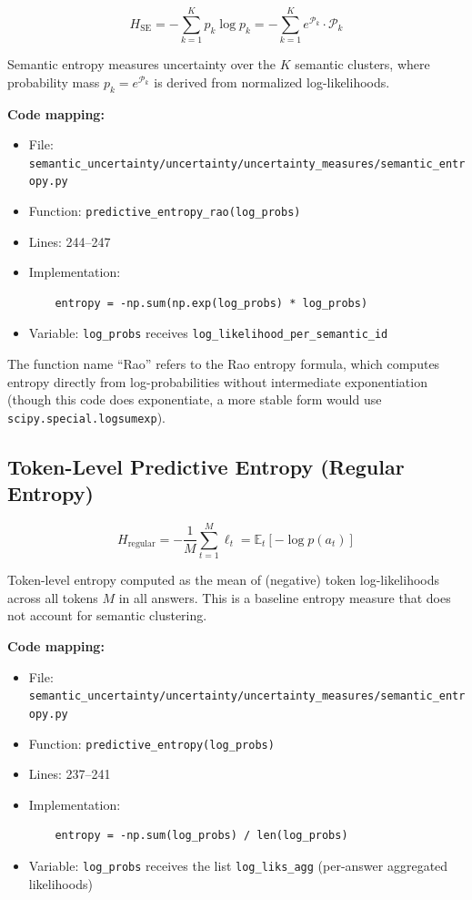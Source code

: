 \documentclass{article}
\begin{document}
\begin{equation}
H_{\text{SE}} = -\sum_{k=1}^{K} p_k \log p_k = -\sum_{k=1}^{K} e^{\mathcal{P}_k} \cdot \mathcal{P}_k
\label{eq:semantic_entropy}
\end{equation}

Semantic entropy measures uncertainty over the $K$ semantic clusters, where probability mass $p_k = e^{\mathcal{P}_k}$ is derived from normalized log-likelihoods.

\textbf{Code mapping:}
\begin{itemize}
    \item File: \texttt{semantic\_uncertainty/uncertainty/uncertainty\_measures/semantic\_entropy.py}
    \item Function: \texttt{predictive\_entropy\_rao(log\_probs)}
    \item Lines: 244--247
    \item Implementation:
    \begin{verbatim}
    entropy = -np.sum(np.exp(log_probs) * log_probs)
    \end{verbatim}
    \item Variable: \texttt{log\_probs} receives \texttt{log\_likelihood\_per\_semantic\_id}
\end{itemize}

The function name ``Rao'' refers to the Rao entropy formula, which computes entropy directly from log-probabilities without intermediate exponentiation (though this code does exponentiate, a more stable form would use \texttt{scipy.special.logsumexp}).

\subsection{Token-Level Predictive Entropy (Regular Entropy)}

\begin{equation}
H_{\text{regular}} = -\frac{1}{M} \sum_{t=1}^{M} \ell_t = \mathbb{E}_{t}[-\log p(a_t)]
\label{eq:regular_entropy}
\end{equation}

Token-level entropy computed as the mean of (negative) token log-likelihoods across all tokens $M$ in all answers. This is a baseline entropy measure that does not account for semantic clustering.

\textbf{Code mapping:}
\begin{itemize}
    \item File: \texttt{semantic\_uncertainty/uncertainty/uncertainty\_measures/semantic\_entropy.py}
    \item Function: \texttt{predictive\_entropy(log\_probs)}
    \item Lines: 237--241
    \item Implementation:
    \begin{verbatim}
    entropy = -np.sum(log_probs) / len(log_probs)
    \end{verbatim}
    \item Variable: \texttt{log\_probs} receives the list \texttt{log\_liks\_agg} (per-answer aggregated likelihoods)
\end{itemize}
\end{document}
